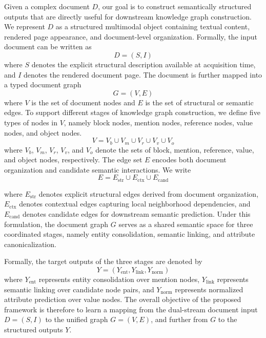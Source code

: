 \documentclass[pdflatex,twocolumn,iicol,sn-vancouver-num]{sn-jnl}%
\theoremstyle{thmstyleone}%
\theoremstyle{thmstyletwo}%
\theoremstyle{thmstylethree}%
\begin{document}
Given a complex document \(D\), our goal is to construct semantically structured outputs that are directly useful for downstream knowledge graph construction. We represent \(D\) as a structured multimodal object containing textual content, rendered page appearance, and document-level organization. Formally, the input document can be written as
\begin{equation}
D = (S, I)
\label{eq:document_input}
\end{equation}
where \(S\) denotes the explicit structural description available at acquisition time, and \(I\) denotes the rendered document page. The document is further mapped into a typed document graph
\begin{equation}
G = (V, E)
\label{eq:graph}
\end{equation}
where \(V\) is the set of document nodes and \(E\) is the set of structural or semantic edges. To support different stages of knowledge graph construction, we define five types of nodes in \(V\), namely block nodes, mention nodes, reference nodes, value nodes, and object nodes.
\begin{equation}
    V = V_b \cup V_m \cup V_r \cup V_v \cup V_o
\end{equation}
where \(V_b\), \(V_m\), \(V_r\), \(V_v\), and \(V_o\) denote the sets of block, mention, reference, value, and object nodes, respectively. The edge set \(E\) encodes both document organization and candidate semantic interactions. We write
\begin{equation}
E = E_{\mathrm{str}} \cup E_{\mathrm{ctx}} \cup E_{\mathrm{cand}}
\end{equation}
          
where \(E_{\mathrm{str}}\) denotes explicit structural edges derived from document organization, \(E_{\mathrm{ctx}}\) denotes contextual edges capturing local neighborhood dependencies, and \(E_{\mathrm{cand}}\) denotes candidate edges for downstream semantic prediction. Under this formulation, the document graph \(G\) serves as a shared semantic space for three coordinated stages, namely entity consolidation, semantic linking, and attribute canonicalization.

Formally, the target outputs of the three stages are denoted by
\begin{equation}
Y = (Y_{\mathrm{ent}}, Y_{\mathrm{link}}, Y_{\mathrm{norm}})
\end{equation}
where \(Y_{\mathrm{ent}}\) represents entity consolidation over mention nodes, \(Y_{\mathrm{link}}\) represents semantic linking over candidate node pairs, and \(Y_{\mathrm{norm}}\) represents normalized attribute prediction over value nodes. The overall objective of the proposed framework is therefore to learn a mapping from the dual-stream document input \(D = (S, I)\) to the unified graph \(G = (V, E)\), and further from \(G\) to the structured outputs \(Y\).
\end{document}
